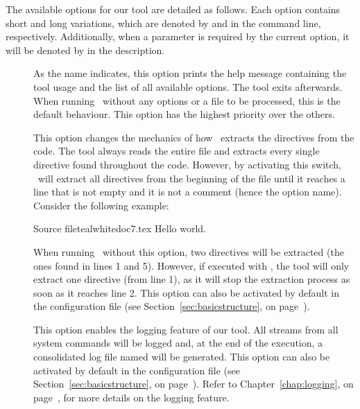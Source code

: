 The available options for our tool are detailed as follows. Each option contains short and long variations, which are denoted by  and  in the command line, respectively. Additionally, when a parameter is required by the current option, it will be denoted by  in the description.

\begin{description}
\item[] As the name indicates, this option prints the help message containing the tool usage and the list of all available options. The tool exits afterwards. When running \arara\ without any options or a file to be processed, this is the default behaviour. This option has the highest priority over the others.

\item[] This option changes the mechanics of how \arara\ extracts the directives from the code. The tool always reads the entire file and extracts every single directive found throughout the code. However, by activating this switch, \arara\ will extract all directives from the beginning of the file until it reaches a line that is not empty and it is not a comment (hence the option name). Consider the following example:

\begin{ncodebox}{Source file}{teal}{\icnote}{white}{doc7.tex}
Hello world.
\bye

\end{ncodebox}

When running \arara\ without this option, two directives will be extracted (the ones found in lines 1 and 5). However, if executed with , the tool will only extract one directive (from line 1), as it will stop the extraction process as soon as it reaches line 2. This option can also be activated by default in the configuration file (see Section~\ref{sec:basicstructure}, on page~\pageref{sec:basicstructure}).

\item[] This option enables the logging feature of our tool. All streams from all system commands will be logged and, at the end of the execution, a consolidated log file named  will be generated. This option can also be activated by default in the configuration file (see Section~\ref{sec:basicstructure}, on page~\pageref{sec:basicstructure}). Refer to Chapter~\ref{chap:logging}, on page~\pageref{chap:logging}, for more details on the logging feature.


\end{description}
